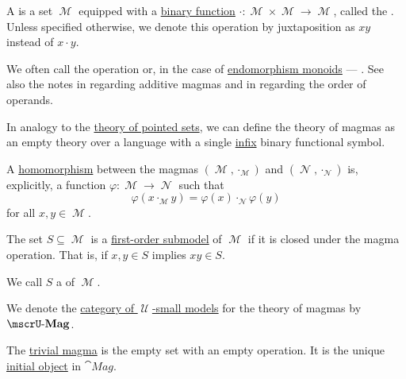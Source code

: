 \begin{definition}\label{def:magma}
  A  is a set \( \mscrM \) equipped with a \hyperref[def:multi_valued_function/arguments]{binary function} \( \cdot: \mscrM \times \mscrM \to \mscrM \), called the . Unless specified otherwise, we denote this operation by juxtaposition as \( xy \) instead of \( x \cdot y \).

  We often call the operation  or, in the case of \hyperref[def:endomorphism_monoid]{endomorphism monoids} --- . See also the notes in  regarding additive magmas and in  regarding the order of operands.

  \begin{thmenum}[series=def:magma]
     In analogy to the \hyperref[def:pointed_set/theory]{theory of pointed sets}, we can define the theory of magmas as an empty theory over a language with a single \hyperref[rem:first_order_formula_conventions/infix]{infix} binary functional symbol.

     A \hyperref[def:first_order_homomorphism]{homomorphism} between the magmas \( (\mscrM, \cdot_{\mscrM}) \) and \( (\mscrN, \cdot_{\mscrN}) \) is, explicitly, a function \( \varphi: \mscrM \to \mscrN \) such that
    \begin{equation}\label{eq:def:magma/homomorphism}
      \varphi(x \cdot_{\mscrM} y) = \varphi(x) \cdot_{\mscrN} \varphi(y)
    \end{equation}
    for all \( x, y \in \mscrM \).

     The set \( S \subseteq \mscrM \) is a \hyperref[def:first_order_substructure]{first-order submodel} of \( \mscrM \) if it is closed under the magma operation. That is, if \( x, y \in S \) implies \( xy \in S \).

    We call \( S \) a  of \( \mscrM \).

     We denote the \hyperref[def:category_of_small_first_order_models]{category of \( \mscrU \)-small models} for the theory of magmas by \( \ucat{Mag} \).

     The \hyperref[thm:substructures_form_complete_lattice/bottom]{trivial magma} is the empty set with an empty operation. It is the unique \hyperref[def:universal_objects/initial]{initial object} in \( \cat{Mag} \).


\end{thmenum}
\end{definition}
